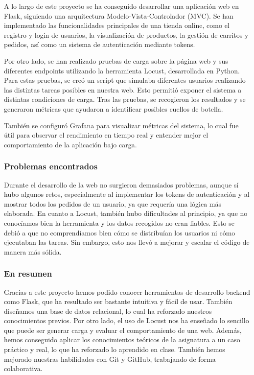 \documentclass[10pt]{book}
\begin{document}
A lo largo de este proyecto se ha conseguido desarrollar una aplicación web en Flask, siguiendo una arquitectura Modelo-Vista-Controlador (MVC). Se han implementado las funcionalidades principales de una tienda online, como el registro y login de usuarios, la visualización de productos, la gestión de carritos y pedidos, así como un sistema de autenticación mediante tokens.

Por otro lado, se han realizado pruebas de carga sobre la página web y sus diferentes endpoints utilizando la herramienta Locust, desarrollada en Python. Para estas pruebas, se creó un script que simulaba diferentes usuarios realizando las distintas tareas posibles en nuestra web. Esto permitió exponer el sistema a distintas condiciones de carga. Tras las pruebas, se recogieron los resultados y se generaron métricas que ayudaron a identificar posibles cuellos de botella.

También se configuró Grafana para visualizar métricas del sistema, lo cual fue útil para observar el rendimiento en tiempo real y entender mejor el comportamiento de la aplicación bajo carga.

\subsubsection*{Problemas encontrados}
Durante el desarrollo de la web no surgieron demasiados problemas, aunque sí hubo algunos retos, especialmente al implementar los tokens de autenticación y al mostrar todos los pedidos de un usuario, ya que requería una lógica más elaborada. En cuanto a Locust, también hubo dificultades al principio, ya que no conocíamos bien la herramienta y los datos recogidos no eran fiables. Esto se debió a que no comprendíamos bien cómo se distribuían los usuarios ni cómo ejecutaban las tareas. Sin embargo, esto nos llevó a mejorar y escalar el código de manera más sólida.

\subsubsection*{En resumen}
Gracias a este proyecto hemos podido conocer herramientas de desarrollo backend como Flask, que ha resultado ser bastante intuitiva y fácil de usar. También diseñamos una base de datos relacional, lo cual ha reforzado nuestros conocimientos previos. Por otro lado, el uso de Locust nos ha enseñado lo sencillo que puede ser generar carga y evaluar el comportamiento de una web. Además, hemos conseguido aplicar los conocimientos teóricos de la asignatura a un caso práctico y real, lo que ha reforzado lo aprendido en clase. También hemos mejorado nuestras habilidades con Git y GitHub, trabajando de forma colaborativa.
\end{document}
